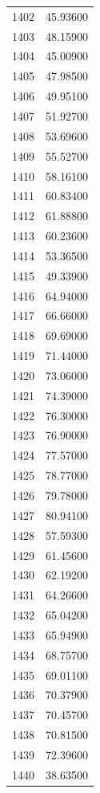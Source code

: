 \documentclass[
  letterpaper,
  DIV=11,
  numbers=noendperiod]{scrreprt}
\begin{document}
\begin{tcolorbox}
\begin{tabular}{lr}
1402 &         45.93600 \\
1403 &         48.15900 \\
1404 &         45.00900 \\
1405 &         47.98500 \\
1406 &         49.95100 \\
1407 &         51.92700 \\
1408 &         53.69600 \\
1409 &         55.52700 \\
1410 &         58.16100 \\
1411 &         60.83400 \\
1412 &         61.88800 \\
1413 &         60.23600 \\
1414 &         53.36500 \\
1415 &         49.33900 \\
1416 &         64.94000 \\
1417 &         66.66000 \\
1418 &         69.69000 \\
1419 &         71.44000 \\
1420 &         73.06000 \\
1421 &         74.39000 \\
1422 &         76.30000 \\
1423 &         76.90000 \\
1424 &         77.57000 \\
1425 &         78.77000 \\
1426 &         79.78000 \\
1427 &         80.94100 \\
1428 &         57.59300 \\
1429 &         61.45600 \\
1430 &         62.19200 \\
1431 &         64.26600 \\
1432 &         65.04200 \\
1433 &         65.94900 \\
1434 &         68.75700 \\
1435 &         69.01100 \\
1436 &         70.37900 \\
1437 &         70.45700 \\
1438 &         70.81500 \\
1439 &         72.39600 \\
1440 &         38.63500 \\

\end{tabular}
\end{tcolorbox}
\end{document}
